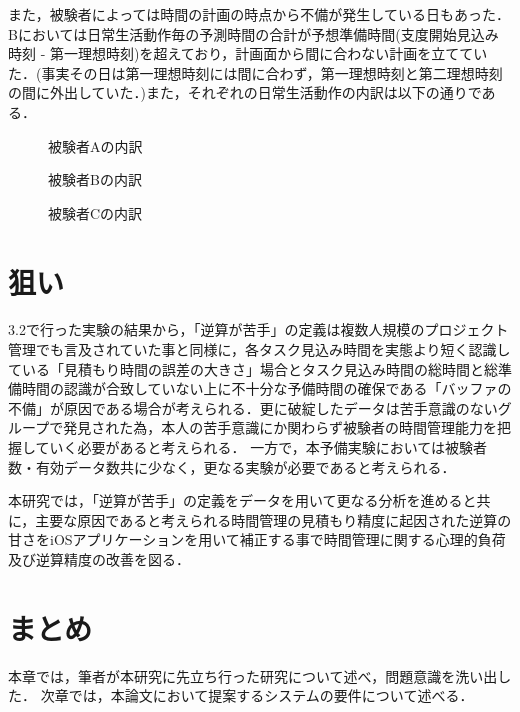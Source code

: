 また，被験者によっては時間の計画の時点から不備が発生している日もあった．Bにおいては日常生活動作毎の予測時間の合計が予想準備時間(支度開始見込み時刻 - 第一理想時刻)を超えており，計画面から間に合わない計画を立てていた．(事実その日は第一理想時刻には間に合わず，第一理想時刻と第二理想時刻の間に外出していた．)また，それぞれの日常生活動作の内訳は以下の通りである．

\begin{figure}[hb]
	\begin{center}
		\caption{被験者Aの内訳}
		\label{fig:top_point}
	\end{center}
\end{figure}

\begin{figure}[hb]
	\begin{center}
		\caption{被験者Bの内訳}
		\label{fig:top_point}
	\end{center}
\end{figure}

\begin{figure}[hb]
	\begin{center}
		\caption{被験者Cの内訳}
		\label{fig:top_point}
	\end{center}
\end{figure}

\section{狙い}
3.2で行った実験の結果から，「逆算が苦手」の定義は複数人規模のプロジェクト管理でも言及されていた事と同様に，各タスク見込み時間を実態より短く認識している「見積もり時間の誤差の大きさ」場合とタスク見込み時間の総時間と総準備時間の認識が合致していない上に不十分な予備時間の確保である「バッファの不備」が原因である場合が考えられる．更に破綻したデータは苦手意識のないグループで発見された為，本人の苦手意識にか関わらず被験者の時間管理能力を把握していく必要があると考えられる．
一方で，本予備実験においては被験者数・有効データ数共に少なく，更なる実験が必要であると考えられる．

本研究では，「逆算が苦手」の定義をデータを用いて更なる分析を進めると共に，主要な原因であると考えられる時間管理の見積もり精度に起因された逆算の甘さをiOSアプリケーションを用いて補正する事で時間管理に関する心理的負荷及び逆算精度の改善を図る．

\section{まとめ}
本章では，筆者が本研究に先立ち行った研究について述べ，問題意識を洗い出した．
次章では，本論文において提案するシステムの要件について述べる．